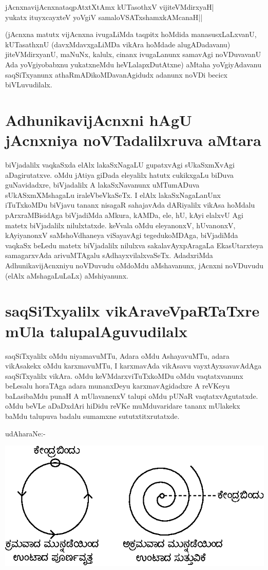\begin{shloka}
jAcnxnavijAcnxnataqpAtxtXtAmx kUTasothxV vijiteVMdirxyaH|\label{66}\\
yukatx ituyxcayxteV yoVgiV samaloVSATxshamxkAMcanaH||
\end{shloka}

(jAcnxna matutx vijAcnxna ivugaLiMda taqpitx hoMdida manasusxLaLxvanU, kUTasathxnU (davxMdavxgaLiMDa vikAra hoMdade alugADadavanu) jiteVMdirxyanU, maNuNx, kalulx, cinanx ivugaLanunx samavAgi noVDuvavanU Ada yoVgiyobabxnu yukatxneMdu heVLalapxDutAtxne) aMtaha yoVgiyAdavanu saqSiTxyanunx athaRmADikoMDavanAgidudx adanunx noVDi becicx biVLuvudilalx.

\section*{AdhunikavijAcnxni hAgU jAcnxniya noVTadalilxruva aMtara}

biVjadalilx vaqkaSxda elAlx lakaSxNagaLU gupatxvAgi sUkaSxmXvAgi aDagirutatxve. oMdu jAtiya giDada eleyalilx hatutx cukikxgaLu biDuva guNavidadxre, biVjadalilx A lakaSxNavanunx uMTumADuva sUkASxmXMshagaLu iraleVbeVkaSeTx. I elAlx lakaSxNagaLanUnx iTuTxkoMDu biVjavu tananx nisagaR sahajavAda dARiyalilx vikAsa hoMdalu pArxraMBisidAga biVjadiMda aMkura, kAMDa, ele, hU, kAyi elalxvU Agi matetx biVjadalilx nilulxtatxde. keVvala oMdu eleyanonxV, hUvanonxV, kAyiyanonxV saMshoVdhaneya viSayavAgi tegedukoMDAga, biVjadiMda vaqkaSx beLedu matetx biVjadalilx nilulxva sakalavAyxpAragaLa EkasUtarxteya samagarxvAda arivuMTAgalu sAdhayxvilalxvaSeTx. AdadxriMda AdhunikavijAcnxniyu noVDuvudu oMdoMdu aMshavanunx, jAcnxni noVDuvudu (elAlx aMshagaLuLaLx) aMshiyanunx.

\section*{saqSiTxyalilx vikAraveVpaRTaTxre mUla talupalAguvudilalx}

saqSiTxyalilx oMdu niyamavuMTu, Adara oMdu AshayavuMTu, adara vikAsakekx oMdu karxmavuMTu, I karxmavAda vikAsavu vayxtAyxsavavAdAga saqSiTxyalilx vikAra. oMdu keVMdarxviTuTxkoMDu oMdu vaqtatxvanunx beLesalu horaTAga adara munanxDeyu karxmavAgidadxre A reVKeyu baLasibaMdu punaH A mUlavanenxV talupi oMdu pUNaR vaqtatxvAgutatxde. oMdu beVLe aDaDxdAri hiDidu reVKe muMduvaridare tananx mUlakekx baMdu talupuva badalu sumamxne sututxtitxrutatxde.

udAharaNe:-
\begin{center}
\includegraphics{chap5-fig1.eps}
\end{center}

